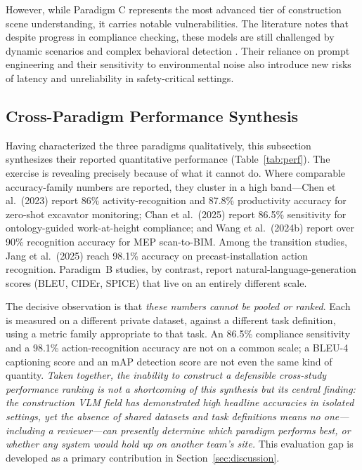 \documentclass[10pt,letterpaper]{article}
\begin{document}
However, while Paradigm C represents the most advanced tier of construction scene understanding, it carries notable vulnerabilities. The literature notes that despite progress in compliance checking, these models are still challenged by dynamic scenarios and complex behavioral detection \cite{hussain2026}. Their reliance on prompt engineering and their sensitivity to environmental noise also introduce new risks of latency and unreliability in safety-critical settings.

\subsection{Cross-Paradigm Performance Synthesis}

Having characterized the three paradigms qualitatively, this subsection synthesizes their reported quantitative performance (Table~\ref{tab:perf}). The exercise is revealing precisely because of what it cannot do. Where comparable accuracy-family numbers are reported, they cluster in a high band---Chen et al.\ (2023) report 86\% activity-recognition and 87.8\% productivity accuracy for zero-shot excavator monitoring; Chan et al.\ (2025) report 86.5\% sensitivity for ontology-guided work-at-height compliance; and Wang et al.\ (2024b) report over 90\% recognition accuracy for MEP scan-to-BIM. Among the transition studies, Jang et al.\ (2025) reach 98.1\% accuracy on precast-installation action recognition. Paradigm~B studies, by contrast, report natural-language-generation scores (BLEU, CIDEr, SPICE) that live on an entirely different scale.

The decisive observation is that \emph{these numbers cannot be pooled or ranked}. Each is measured on a different private dataset, against a different task definition, using a metric family appropriate to that task. An 86.5\% compliance sensitivity and a 98.1\% action-recognition accuracy are not on a common scale; a BLEU-4 captioning score and an mAP detection score are not even the same kind of quantity. \textit{Taken together, the inability to construct a defensible cross-study performance ranking is not a shortcoming of this synthesis but its central finding: the construction VLM field has demonstrated high headline accuracies in isolated settings, yet the absence of shared datasets and task definitions means no one---including a reviewer---can presently determine which paradigm performs best, or whether any system would hold up on another team's site.} This evaluation gap is developed as a primary contribution in Section~\ref{sec:discussion}.
\end{document}
